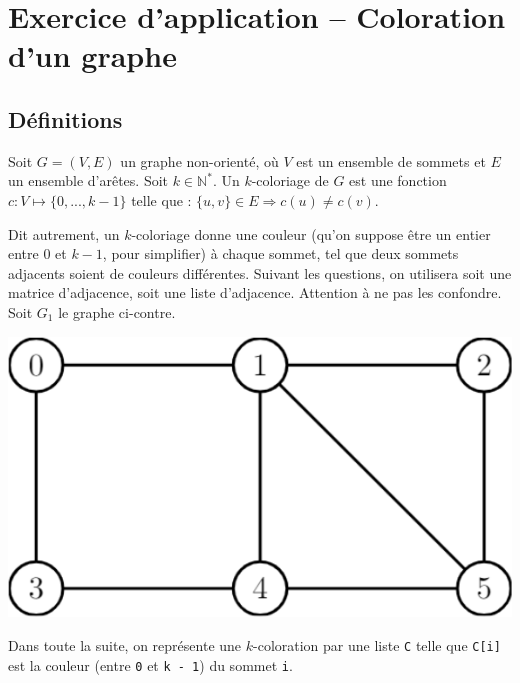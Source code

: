 \chapter*{Exercice d'application -- Coloration d'un graphe} 

\section*{Définitions}
Soit $G = (V, E)$ un graphe non-orienté, où $V$ est un ensemble de sommets et $E$ un ensemble d’arêtes. Soit $k\in\mathbb{N}^*$. Un
$k$-coloriage de $G$ est une fonction $c : V \mapsto \{0, ..., k - 1\}$ telle que :
$\{u, v\} \in E\Rightarrow c(u) \neq c(v)$.

Dit autrement, un $k$-coloriage donne une couleur (qu’on suppose être un entier entre 0 et $k-1$, pour simplifier) à chaque sommet,
tel que deux sommets adjacents soient de couleurs différentes.
Suivant les questions, on utilisera soit une matrice d’adjacence, soit une liste d’adjacence. Attention à ne pas les confondre.
Soit $G_1$ le graphe ci-contre.
\begin{marginfigure}
\includegraphics[width=\linewidth]{fig_01}
\end{marginfigure}




Dans toute la suite, on représente une $k$-coloration par une liste \lstinline{C} telle que \lstinline{C[i]} est la couleur (entre \lstinline{0} et \lstinline{k - 1})
du sommet \lstinline{i}.

